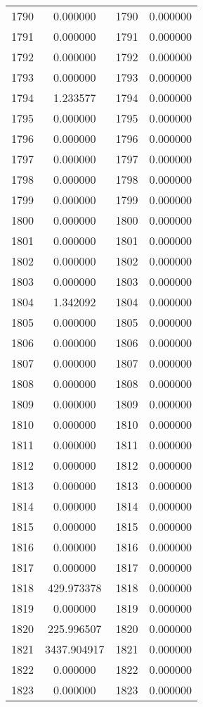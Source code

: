 \documentclass[12pt]{article}
\begin{document}
\begin{longtable}{@{}cccc@{}}
1790 & 0.000000 & 1790 & 0.000000 \\
1791 & 0.000000 & 1791 & 0.000000 \\
1792 & 0.000000 & 1792 & 0.000000 \\
1793 & 0.000000 & 1793 & 0.000000 \\
1794 & 1.233577 & 1794 & 0.000000 \\
1795 & 0.000000 & 1795 & 0.000000 \\
1796 & 0.000000 & 1796 & 0.000000 \\
1797 & 0.000000 & 1797 & 0.000000 \\
1798 & 0.000000 & 1798 & 0.000000 \\
1799 & 0.000000 & 1799 & 0.000000 \\
1800 & 0.000000 & 1800 & 0.000000 \\
1801 & 0.000000 & 1801 & 0.000000 \\
1802 & 0.000000 & 1802 & 0.000000 \\
1803 & 0.000000 & 1803 & 0.000000 \\
1804 & 1.342092 & 1804 & 0.000000 \\
1805 & 0.000000 & 1805 & 0.000000 \\
1806 & 0.000000 & 1806 & 0.000000 \\
1807 & 0.000000 & 1807 & 0.000000 \\
1808 & 0.000000 & 1808 & 0.000000 \\
1809 & 0.000000 & 1809 & 0.000000 \\
1810 & 0.000000 & 1810 & 0.000000 \\
1811 & 0.000000 & 1811 & 0.000000 \\
1812 & 0.000000 & 1812 & 0.000000 \\
1813 & 0.000000 & 1813 & 0.000000 \\
1814 & 0.000000 & 1814 & 0.000000 \\
1815 & 0.000000 & 1815 & 0.000000 \\
1816 & 0.000000 & 1816 & 0.000000 \\
1817 & 0.000000 & 1817 & 0.000000 \\
1818 & 429.973378 & 1818 & 0.000000 \\
1819 & 0.000000 & 1819 & 0.000000 \\
1820 & 225.996507 & 1820 & 0.000000 \\
1821 & 3437.904917 & 1821 & 0.000000 \\
1822 & 0.000000 & 1822 & 0.000000 \\
1823 & 0.000000 & 1823 & 0.000000 \\

\end{longtable}
\end{document}
